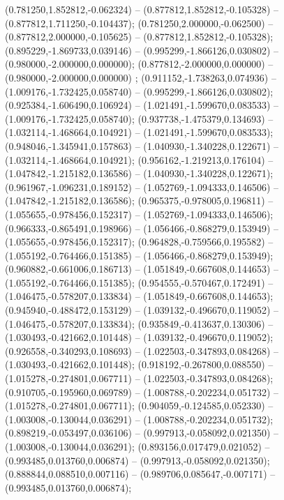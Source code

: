  (0.781250,1.852812,-0.062324) -- (0.877812,1.852812,-0.105328) -- (0.877812,1.711250,-0.104437);
 (0.781250,2.000000,-0.062500) -- (0.877812,2.000000,-0.105625) -- (0.877812,1.852812,-0.105328);
 (0.895229,-1.869733,0.039146) -- (0.995299,-1.866126,0.030802) -- (0.980000,-2.000000,0.000000);
 (0.877812,-2.000000,0.000000) -- (0.980000,-2.000000,0.000000) ;
 (0.911152,-1.738263,0.074936) -- (1.009176,-1.732425,0.058740) -- (0.995299,-1.866126,0.030802);
 (0.925384,-1.606490,0.106924) -- (1.021491,-1.599670,0.083533) -- (1.009176,-1.732425,0.058740);
 (0.937738,-1.475379,0.134693) -- (1.032114,-1.468664,0.104921) -- (1.021491,-1.599670,0.083533);
 (0.948046,-1.345941,0.157863) -- (1.040930,-1.340228,0.122671) -- (1.032114,-1.468664,0.104921);
 (0.956162,-1.219213,0.176104) -- (1.047842,-1.215182,0.136586) -- (1.040930,-1.340228,0.122671);
 (0.961967,-1.096231,0.189152) -- (1.052769,-1.094333,0.146506) -- (1.047842,-1.215182,0.136586);
 (0.965375,-0.978005,0.196811) -- (1.055655,-0.978456,0.152317) -- (1.052769,-1.094333,0.146506);
 (0.966333,-0.865491,0.198966) -- (1.056466,-0.868279,0.153949) -- (1.055655,-0.978456,0.152317);
 (0.964828,-0.759566,0.195582) -- (1.055192,-0.764466,0.151385) -- (1.056466,-0.868279,0.153949);
 (0.960882,-0.661006,0.186713) -- (1.051849,-0.667608,0.144653) -- (1.055192,-0.764466,0.151385);
 (0.954555,-0.570467,0.172491) -- (1.046475,-0.578207,0.133834) -- (1.051849,-0.667608,0.144653);
 (0.945940,-0.488472,0.153129) -- (1.039132,-0.496670,0.119052) -- (1.046475,-0.578207,0.133834);
 (0.935849,-0.413637,0.130306) -- (1.030493,-0.421662,0.101448) -- (1.039132,-0.496670,0.119052);
 (0.926558,-0.340293,0.108693) -- (1.022503,-0.347893,0.084268) -- (1.030493,-0.421662,0.101448);
 (0.918192,-0.267800,0.088550) -- (1.015278,-0.274801,0.067711) -- (1.022503,-0.347893,0.084268);
 (0.910705,-0.195960,0.069789) -- (1.008788,-0.202234,0.051732) -- (1.015278,-0.274801,0.067711);
 (0.904059,-0.124585,0.052330) -- (1.003008,-0.130044,0.036291) -- (1.008788,-0.202234,0.051732);
 (0.898219,-0.053497,0.036106) -- (0.997913,-0.058092,0.021350) -- (1.003008,-0.130044,0.036291);
 (0.893156,0.017479,0.021052) -- (0.993485,0.013760,0.006874) -- (0.997913,-0.058092,0.021350);
 (0.888844,0.088510,0.007116) -- (0.989706,0.085647,-0.007171) -- (0.993485,0.013760,0.006874);
